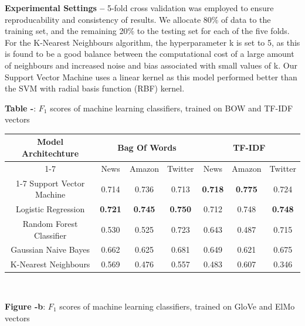 \documentclass[12pt,a4paper]{article}
\begin{document}
\noindent \textbf{Experimental Settings --} 5-fold cross validation was employed to ensure reproducability and consistency of results. We allocate 80\% of data to the training set, and the remaining 20\% to the testing set for each of the five folds. For the K-Nearest Neighbours algorithm, the hyperparameter k is set to 5, as this is found to be a good balance between the computational cost of a large amount of neighbours and increased noise and bias associated with small values of k. Our Support Vector Machine uses a linear kernel as this model performed better than the SVM with radial basis function (RBF) kernel.
\newpage
\begin{center}
	\textbf{Table -}: $F_1$ scores of machine learning classifiers, trained on BOW and TF-IDF vectors
\end{center}

\begin{tabular}{|c||c|c|c||c|c|c|}
	\hline
		\multirow{3}{*}{\textbf{Model Architechture}} & \multicolumn{3}{c||}{\textbf{Bag Of Words}} & \multicolumn{3}{c|}{\textbf{TF-IDF}}\\
	\cline{1-7}
	& News & Amazon & Twitter & News & Amazon & Twitter\\
	\cline{1-7}
	Support Vector Machine & 0.714 & 0.736 & 0.713 &\textbf{0.718} &\textbf{0.775} & 0.724\\
	Logistic Regression & \textbf{0.721}& \textbf{0.745}& \textbf{0.750}&0.712 &0.748 & \textbf{0.748}\\
	Random Forest Classifier &0.530 &0.525 & 0.723 &0.643 & 0.487 & 0.715\\
	Gaussian Naive Bayes & 0.662& 0.625& 0.681 &0.649 &0.621 & 0.675\\
	K-Nearest Neighbours & 0.569& 0.476& 0.557 & 0.483& 0.607 & 0.346\\
	\hline
\end{tabular}\\

\begin{center}
	\textbf{Figure -b}: $F_1$ scores of machine learning classifiers, trained on GloVe and ElMo vectors
\end{center}
\end{document}
